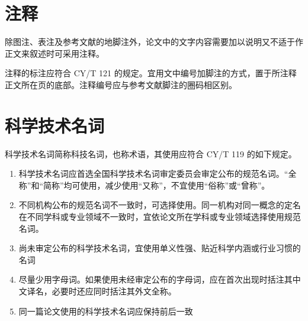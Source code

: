 \SubSectionEnd
\section{注释}
除图注、表注及参考文献的地脚注外，论文中的文字内容需要加以说明又不适于作正文来叙述时可采用注释。

注释的标注应符合 CY/T 121 的规定。宜用文中编号加脚注的方式，置于所注释正文所在页的底部。注释编号应与参考文献脚注的圈码相区别。

\section{科学技术名词}
科学技术名词简称科技名词，也称术语，其使用应符合 CY/T 119 的如下规定。

\begin{enumerate}
 \item  科学技术名词应首选全国科学技术名词审定委员会审定公布的规范名词。“全称”和“简称”均可使用，减少使用“又称”，不宜使用“俗称”或“曾称”。

\item 不同机构公布的规范名词不一致时，可选择使用。同一机构对同一概念的定名在不同学科或专业领域不一致时，宜依论文所在学科或专业领域选择使用规范名词。

\item 尚未审定公布的科学技术名词，宜使用单义性强、贴近科学内涵或行业习惯的名词

\item 尽量少用字母词。如果使用未经审定公布的字母词，应在首次出现时括注其中文译名，必要时还应同时括注其外文全称。

\item 同一篇论文使用的科学技术名词应保持前后一致
\end{enumerate}%
%
